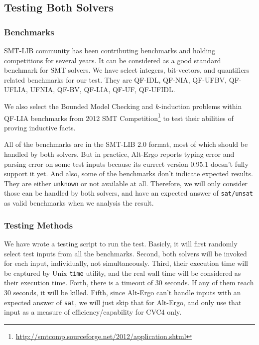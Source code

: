 \documentclass[10pt,letter]{article}
\theoremstyle{definition}
\begin{document}
\subsection{Testing Both Solvers}

\subsubsection{Benchmarks}

SMT-LIB community has been contributing benchmarks and holding competitions for several years\cite{bs2010}. It can be considered as a good standard benchmark for SMT solvers. We have select integers, bit-vectors, and quantifiers related benchmarks for our test. They are QF-IDL, QF-NIA, QF-UFBV, QF-UFLIA, UFNIA, QF-BV, QF-LIA, QF-UF, QF-UFIDL.

We also select the Bounded Model Checking and $k$-induction problems within QF-LIA benchmarks from 2012 SMT Competition\footnote{\url{http://smtcomp.sourceforge.net/2012/application.shtml}}\cite{cok20122012} 
to test their abilities of proving inductive facts.

All of the benchmarks are in the SMT-LIB 2.0 format, most of which should be handled by both solvers. But in practice, Alt-Ergo reports typing error and parsing error on some test inputs because its currect version 0.95.1 doesn't fully support it yet. And also, some of the benchmarks don't indicate expected results. They are either {\tt unknown} or not available at all. Therefore, we will only consider those can be handled by both solvers, and have an expected answer of {\tt sat/unsat} as valid benchmarks when we analysis the result.

\subsubsection{Testing Methods}

We have wrote a testing script to run the test. Basicly, it will first randomly select test inputs from all the benchmarks. Second, both solvers will be invoked for each input, individually, not simultaneously. Third, their execution time will be captured by Unix {\tt time} utility, and the real wall time will be considered as their execution time. Forth, there is a timeout of 30 seconds. If any of them reach 30 seconds, it will be killed. Fifth, since Alt-Ergo can't handle inputs with an expected answer of {\tt sat}, we will just skip that for Alt-Ergo, and only use that input as a measure of efficiency/capability for CVC4 only.
\end{document}

